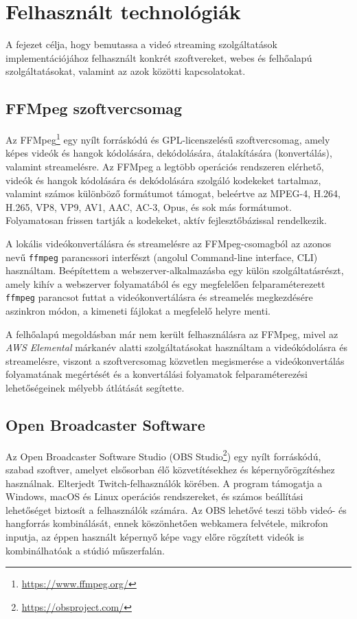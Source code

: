 \chapter{Felhasznált technológiák}

A fejezet célja, hogy bemutassa a videó streaming szolgáltatások implementációjához felhasznált konkrét szoftvereket, webes és felhőalapú szolgáltatásokat, valamint az azok közötti kapcsolatokat.

\section{FFMpeg szoftvercsomag}

Az FFMpeg\footnote{\url{https://www.ffmpeg.org/}} egy nyílt forráskódú és GPL-licenszelésű szoftvercsomag, amely képes videók és hangok kódolására, dekódolására, átalakítására (konvertálás), valamint streamelésre.\cite{ffmpeg} Az FFMpeg a legtöbb operációs rendszeren elérhető, videók és hangok kódolására és dekódolására szolgáló kodekeket tartalmaz, valamint számos különböző formátumot támogat, beleértve az MPEG-4, H.264, H.265, VP8, VP9, AV1, AAC, AC-3, Opus, és sok más formátumot. Folyamatosan frissen tartják a kodekeket, aktív fejlesztőbázissal rendelkezik.

A lokális videókonvertálásra és streamelésre az FFMpeg-csomagból az azonos nevű \verb|ffmpeg| parancssori interfészt (angolul Command-line interface, CLI) használtam. Beépítettem a webszerver-alkalmazásba egy külön szolgáltatásrészt, amely kihív a webszerver folyamatából és egy megfelelően felparaméterezett \verb|ffmpeg| parancsot futtat a videókonvertálásra és streamelés megkezdésére aszinkron módon, a kimeneti fájlokat a megfelelő helyre menti.

A felhőalapú megoldásban már nem került felhasználásra az FFMpeg, mivel az \emph{AWS Elemental} márkanév alatti szolgáltatásokat használtam a videókódolásra és streamelésre, viszont a szoftvercsomag közvetlen megismerése a videókonvertálás folyamatának megértését és a konvertálási folyamatok felparaméterezési lehetőségeinek mélyebb átlátását segítette.

\section{Open Broadcaster Software}

Az Open Broadcaster Software Studio (OBS Studio\footnote{\url{https://obsproject.com/}}) egy nyílt forráskódú, szabad szoftver, amelyet elsősorban élő közvetítésekhez és képernyőrögzítéshez használnak. Elterjedt Twitch-felhasználók körében. A program támogatja a Windows, macOS és Linux operációs rendszereket, és számos beállítási lehetőséget biztosít a felhasználók számára. Az OBS lehetővé teszi több videó- és hangforrás kombinálását, ennek köszönhetően webkamera felvétele, mikrofon inputja, az éppen használt képernyő képe vagy előre rögzített videók is kombinálhatóak a stúdió műszerfalán.

